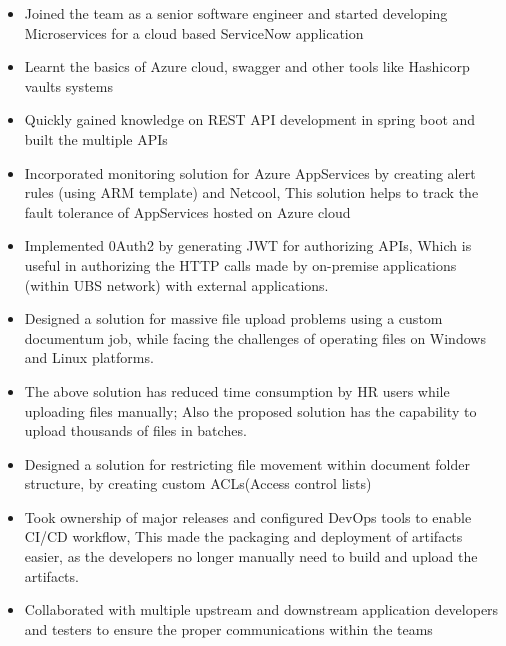 \documentclass[10pt,a4paper,ragged2e,withhyper]{altacv}
\begin{document}
\begin{paracol}{2}
            \begin{itemize}
                \item Joined the team as a senior software engineer and started developing Microservices for a cloud based ServiceNow application 
                \item Learnt the basics of Azure cloud, swagger and other tools like Hashicorp vaults systems
                \item Quickly gained knowledge on REST API development in spring boot and built the multiple APIs
                \item Incorporated monitoring solution for Azure AppServices by creating alert rules (using ARM template) and Netcool, This solution helps to track the fault tolerance of AppServices hosted on Azure cloud 
                \item Implemented 0Auth2 by generating JWT for authorizing APIs, Which is useful in authorizing the HTTP calls made by on-premise applications (within UBS network) with external applications.
            \end{itemize}
            \divider
            \begin{itemize}
                \item Designed a solution for massive file upload problems using a custom documentum  job, while facing the challenges of operating files on Windows and Linux platforms. 
                \item The above solution has reduced time consumption by HR users while uploading files manually; Also the proposed solution has the capability to upload thousands of files in batches.
                \item Designed a solution for restricting file movement within document folder structure, by creating custom ACLs(Access control lists)
                \item Took ownership of major releases and configured DevOps tools to enable CI/CD workflow, This made the packaging and deployment of artifacts easier, as the developers no longer manually need to build and upload the artifacts.
                \item Collaborated with multiple upstream and downstream application developers and testers to ensure the proper communications within the teams 

\end{itemize}
\end{paracol}
\end{document}
